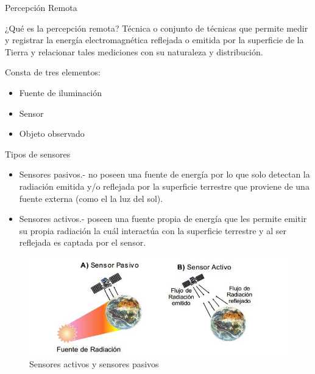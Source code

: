 \begin{frame}{Percepción Remota}
    \begin{block}{¿Qué es la percepción remota?}
        Técnica o conjunto de técnicas que permite medir y registrar la energía
        electromagnética reflejada o emitida por la superficie de la Tierra y 
        relacionar tales mediciones con su naturaleza y distribución.
    \end{block}    

    Consta de tres elementos:
    \begin{itemize}
        \item Fuente de iluminación
        \item Sensor
        \item Objeto observado
    \end{itemize}
\end{frame}

\begin{frame}{Tipos de sensores}
    \begin{itemize}
        \item Sensores pasivos.- no poseen una fuente de energía por lo que solo detectan la radiación emitida y/o reflejada por la superficie terrestre que proviene de una fuente externa (como el la luz del sol).
        \item Sensores activos.- poseen una fuente propia de energía que les permite emitir su propia radiación la cuál interactúa con la superficie terrestre y al ser reflejada es captada por el sensor.
    \end{itemize}
    
    \begin{figure}
        \centering
        \includegraphics[scale=0.4]{img/section_03/tipos_de_sensores.png}
        \caption{Sensores activos y sensores pasivos \cite{phdthesis}}
        \label{fig:section_03_sensores_activos_pasivos}
    \end{figure}
\end{frame}

